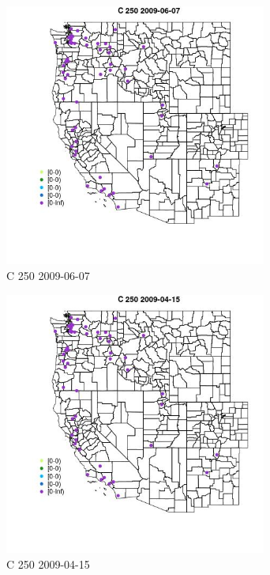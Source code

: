 \begin{figure} 
\centering  
\includegraphics[width=0.77\textwidth]{Code_Outputs/Report_ML_input_PM25_Step4_part_e_de_duplicated_aves_MapObsC_2502009-06-07.jpg} 
\caption{\label{fig:Report_ML_input_PM25_Step4_part_e_de_duplicated_avesMapObsC_2502009-06-07}C 250 2009-06-07} 
\end{figure} 
 

\begin{figure} 
\centering  
\includegraphics[width=0.77\textwidth]{Code_Outputs/Report_ML_input_PM25_Step4_part_e_de_duplicated_aves_MapObsC_2502009-04-15.jpg} 
\caption{\label{fig:Report_ML_input_PM25_Step4_part_e_de_duplicated_avesMapObsC_2502009-04-15}C 250 2009-04-15} 
\end{figure} 
 

